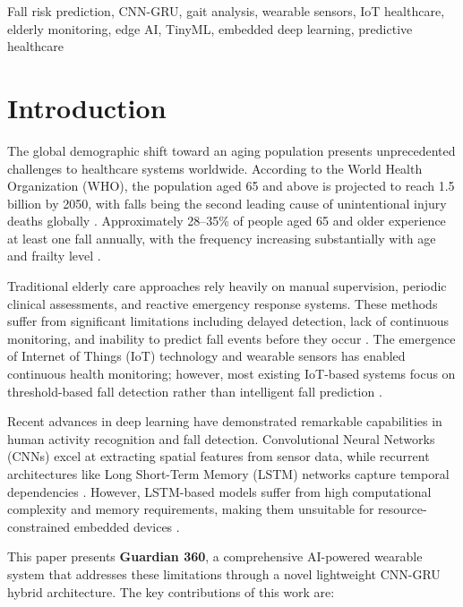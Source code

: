 \documentclass[conference]{IEEEtran}
\begin{document}
\begin{IEEEkeywords}
Fall risk prediction, CNN-GRU, gait analysis, wearable sensors, IoT healthcare, elderly monitoring, edge AI, TinyML, embedded deep learning, predictive healthcare
\end{IEEEkeywords}

\section{Introduction}

The global demographic shift toward an aging population presents unprecedented challenges to healthcare systems worldwide. According to the World Health Organization (WHO), the population aged 65 and above is projected to reach 1.5 billion by 2050, with falls being the second leading cause of unintentional injury deaths globally \cite{who2024}. Approximately 28--35\% of people aged 65 and older experience at least one fall annually, with the frequency increasing substantially with age and frailty level \cite{salma2025}.

Traditional elderly care approaches rely heavily on manual supervision, periodic clinical assessments, and reactive emergency response systems. These methods suffer from significant limitations including delayed detection, lack of continuous monitoring, and inability to predict fall events before they occur \cite{bandara2020, setu2025starlink}. The emergence of Internet of Things (IoT) technology and wearable sensors has enabled continuous health monitoring; however, most existing IoT-based systems focus on threshold-based fall detection rather than intelligent fall prediction \cite{augastiny2023, pasrija2025}.

Recent advances in deep learning have demonstrated remarkable capabilities in human activity recognition and fall detection. Convolutional Neural Networks (CNNs) excel at extracting spatial features from sensor data, while recurrent architectures like Long Short-Term Memory (LSTM) networks capture temporal dependencies \cite{gaud2025, zhang2025}. However, LSTM-based models suffer from high computational complexity and memory requirements, making them unsuitable for resource-constrained embedded devices \cite{li2024}.

This paper presents \textbf{Guardian 360}, a comprehensive AI-powered wearable system that addresses these limitations through a novel lightweight CNN-GRU hybrid architecture. The key contributions of this work are:
\end{document}

